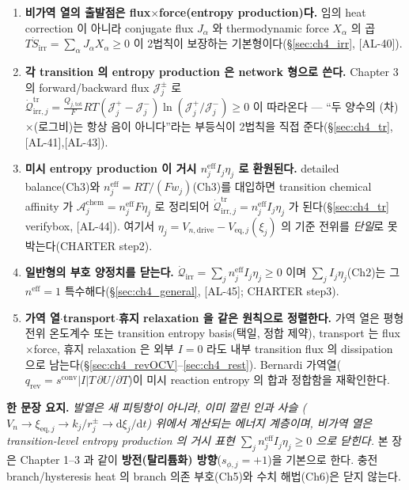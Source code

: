 \documentclass[11pt,a4paper]{article}
\newcommand{\dd}{\mathrm{d}}
\newcommand{\eff}{\mathrm{eff}}
\newcommand{\eq}{\mathrm{eq}}
\newcommand{\drive}{\mathrm{drive}}
\newcommand{\tot}{\mathrm{tot}}
\newcommand{\irr}{\mathrm{irr}}
\newcommand{\rev}{\mathrm{rev}}
\newcommand{\conv}{\mathrm{conv}}
\newcommand{\tr}{\mathrm{tr}}
\newcommand{\chem}{\mathrm{chem}}
\newcommand{\AL}[1]{\textsf{[AL-#1]}}
\begin{document}
\begin{enumerate}[label=\textbf{(\arabic*)},leftmargin=2.2em]
\item \textbf{비가역 열의 출발점은 flux$\times$force(entropy production)다.} 임의 heat correction 이 아니라
  conjugate flux $J_\alpha$ 와 thermodynamic force $X_\alpha$ 의 곱 $T\dot S_\irr=\sum_\alpha J_\alpha X_\alpha\ge0$
  이 2법칙이 보장하는 기본형이다(\S\ref{sec:ch4_irr}, \AL{40}).
\item \textbf{각 transition 의 entropy production 은 network 형으로 쓴다.} Chapter 3 의 forward/backward
  flux $\mathcal J_j^\pm$ 로 $\dot{\mathcal Q}_{\irr,j}^{\tr}=\tfrac{Q_{j,\tot}}{F}RT(\mathcal J_j^+-\mathcal J_j^-)
  \ln(\mathcal J_j^+/\mathcal J_j^-)\ge0$ 이 따라온다 — ``두 양수의 (차)$\times$(로그비)는 항상 음이 아니다''라는
  부등식이 2법칙을 직접 준다(\S\ref{sec:ch4_tr}, \AL{41},\AL{43}).
\item \textbf{미시 entropy production 이 거시 $n_j^{\eff}I_j\eta_j$ 로 환원된다.} detailed balance(Ch3)와
  $n_j^{\eff}=RT/(Fw_j)$(Ch3)를 대입하면 transition chemical affinity 가 $\mathcal A_j^{\chem}=n_j^{\eff}F\eta_j$
  로 정리되어 $\dot{\mathcal Q}_{\irr,j}^{\tr}=n_j^{\eff}I_j\eta_j$ 가 된다(\S\ref{sec:ch4_tr} verifybox,
  \AL{44}). 여기서 $\eta_j=V_{n,\drive}-V_{\eq,j}(\xi_j)$ 의 기준 전위를 \emph{단일}로 못박는다(CHARTER step2).
\item \textbf{일반형의 부호 양정치를 닫는다.} $\dot{\mathcal Q}_\irr=\sum_j n_j^{\eff}I_j\eta_j\ge0$ 이며
  $\sum_j I_j\eta_j$(Ch2)는 그 $n^{\eff}=1$ 특수해다(\S\ref{sec:ch4_general}, \AL{45}; CHARTER step3).
\item \textbf{가역 열$\cdot$transport$\cdot$휴지 relaxation 을 같은 원칙으로 정렬한다.} 가역 열은 평형 전위
  온도계수 또는 transition entropy basis(택일, 정합 제약), transport 는 flux$\times$force, 휴지 relaxation 은
  외부 $I=0$ 라도 내부 transition flux 의 dissipation 으로 남는다(\S\ref{sec:ch4_revOCV}--\ref{sec:ch4_rest}).
  Bernardi 가역열($q_\rev=s^\conv|I|T\,\partial U/\partial T$)이 미시 reaction entropy 의 합과 정합함을
  재확인한다.
\end{enumerate}

\noindent\textbf{한 문장 요지.} \emph{발열은 새 피팅항이 아니라, 이미 깔린 인과 사슬
($V_n\to\xi_{\eq,j}\to k_j/r_j^\pm\to\dd\xi_j/\dd t$) 위에서 계산되는 에너지 계층이며, 비가역 열은
transition-level entropy production 의 거시 표현 $\sum_j n_j^{\eff}I_j\eta_j\ge0$ 으로 닫힌다.} 본 장은
Chapter 1--3 과 같이 \textbf{방전(탈리튬화) 방향}($s_{\phi,j}=+1$)을 기본으로 한다. 충전 branch/hysteresis
heat 의 branch 의존 부호(Ch5)와 수치 해법(Ch6)은 닫지 않는다.
\end{document}
